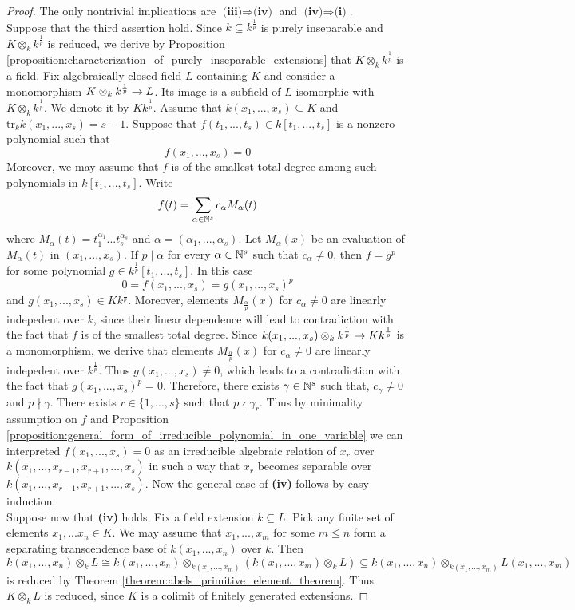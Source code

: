\begin{proof}
The only nontrivial implications are $\textbf{(iii)}\Rightarrow \textbf{(iv)}$ and $\textbf{(iv)}\Rightarrow \textbf{(i)}$.\\
Suppose that the third assertion hold. Since $k\subseteq k^{\frac{1}{p}}$ is purely inseparable and $K\otimes_kk^{\frac{1}{p}}$ is reduced, we derive by Proposition \ref{proposition:characterization_of_purely_inseparable_extensions} that $K\otimes_kk^{\frac{1}{p}}$ is a field. Fix algebraically closed field $L$ containing $K$ and consider a monomorphism $K\otimes_kk^{\frac{1}{p}}\rightarrow L$. Its image is a subfield of $L$ isomorphic with $K\otimes_kk^{\frac{1}{p}}$. We denote it by $K k^{\frac{1}{p}}$. Assume that $k(x_1,...,x_{s})\subseteq K$ and $\mathrm{tr}_kk(x_1,...,x_{s}) = s-1$. Suppose that $f(t_1,...,t_{s})\in k[t_1,...,t_{s}]$ is a nonzero polynomial such that
$$f(x_1,...,x_{s})=0$$
Moreover, we may assume that $f$ is of the smallest total degree among such polynomials in $k[t_1,...,t_s]$. Write
$$f(t)=\sum_{\alpha \in {\mathbb N}^{s}}c_{\alpha}M_{\alpha}(t)$$
where $M_{\alpha}(t)=t^{\alpha_1}_1...t^{\alpha_{s}}_{s}$ and $\alpha=(\alpha_1,...,\alpha_{s})$. Let $M_{\alpha}(x)$ be an evaluation of $M_{\alpha}(t)$ in $(x_1,...,x_{s})$. If $p\mid \alpha$ for every $\alpha\in {\mathbb N}^{s}$ such that $c_{\alpha}\neq 0$, then $f=g^p$ for some polynomial $g\in  k^{\frac{1}{p}}[t_1,...,t_{s}]$. In this case $$0=f(x_1,...,x_{s})=g(x_1,...,x_{s})^p$$
and $g(x_1,...,x_{s})\in Kk^{\frac{1}{p}}$. Moreover, elements $M_{\frac{\alpha}{p}}(x)$ for $c_{\alpha}\neq 0$ are linearly indepedent over $k$, since their linear dependence will lead to contradiction with the fact that $f$ is of the smallest total degree. Since $k(x_1,...,x_{s})\otimes_kk^{\frac{1}{p}}\rightarrow Kk^{\frac{1}{p}}$ is a monomorphism, we derive that elements $M_{\frac{\alpha}{p}}(x)$ for $c_{\alpha}\neq 0$ are linearly indepedent over $k^{\frac{1}{p}}$. Thus $g(x_1,...,x_{s})\neq 0$, which leads to a contradiction with the fact that $g(x_1,...,x_s)^p = 0$. Therefore, there exists $\gamma \in {\mathbb N}^{s}$ such that, $c_{\gamma}\neq 0$ and $p \nmid \gamma$. There exists $r\in \{1,...,s\}$ such that $p\nmid \gamma_r$. Thus by minimality assumption on $f$ and Proposition \ref{proposition:general_form_of_irreducible_polynomial_in_one_variable} we can interpreted $f(x_1,...,x_{s})=0$ as an irreducible algebraic relation of $x_r$ over $k(x_1,...,x_{r-1},x_{r+1},...,x_{s})$ in such a way that $x_r$ becomes separable over $k(x_1,...,x_{r-1},x_{r+1},...,x_s)$. Now the general case of \textbf{(iv)} follows by easy induction.\\
Suppose now that \textbf{(iv)} holds. Fix a field extension $k\subseteq L$. Pick any finite set of elements $x_1,...x_n\in K$. We may assume that $x_1,...,x_m$ for some $m\leq n$ form a separating transcendence base of $k(x_1,...,x_n)$ over $k$. Then
$$k(x_1,...,x_n)\otimes_kL\cong k(x_1,...,x_n)\otimes_{k(x_1,...,x_m)}(k(x_1,...,x_m)\otimes_kL)\subseteq k(x_1,...,x_n)\otimes_{k(x_1,...,x_m)}L(x_1,...,x_m)$$
is reduced by Theorem \ref{theorem:abels_primitive_element_theorem}. Thus $K\otimes_kL$ is reduced, since $K$ is a colimit of finitely generated extensions.
\end{proof}

